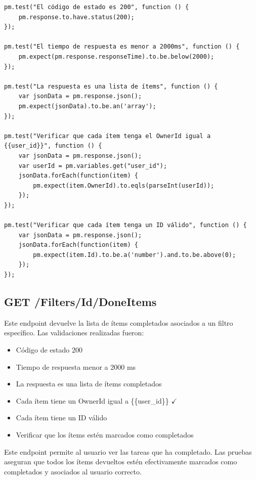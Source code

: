 \documentclass{report}
\begin{document}
\begin{lstlisting}
pm.test("El código de estado es 200", function () {
    pm.response.to.have.status(200);
});

pm.test("El tiempo de respuesta es menor a 2000ms", function () {
    pm.expect(pm.response.responseTime).to.be.below(2000);
});

pm.test("La respuesta es una lista de ítems", function () {
    var jsonData = pm.response.json();
    pm.expect(jsonData).to.be.an('array');
});

pm.test("Verificar que cada ítem tenga el OwnerId igual a {{user_id}}", function () {
    var jsonData = pm.response.json();
    var userId = pm.variables.get("user_id");
    jsonData.forEach(function(item) {
        pm.expect(item.OwnerId).to.eqls(parseInt(userId));
    });
});

pm.test("Verificar que cada ítem tenga un ID válido", function () {
    var jsonData = pm.response.json();
    jsonData.forEach(function(item) {
        pm.expect(item.Id).to.be.a('number').and.to.be.above(0);
    });
});
\end{lstlisting}

\subsection{GET /Filters/Id/DoneItems}
Este endpoint devuelve la lista de ítems completados asociados a un filtro específico. Las validaciones realizadas fueron:
\begin{itemize}
    \item Código de estado 200 \checkmark
    \item Tiempo de respuesta menor a 2000 ms \checkmark
    \item La respuesta es una lista de ítems completados \checkmark
    \item Cada ítem tiene un OwnerId igual a \{\{user\_id\}\} $\checkmark$
    \item Cada ítem tiene un ID válido \checkmark
    \item Verificar que los ítems estén marcados como completados \checkmark
\end{itemize}

Este endpoint permite al usuario ver las tareas que ha completado. Las pruebas aseguran que todos los ítems devueltos estén efectivamente marcados como completados y asociados al usuario correcto.
\end{document}

